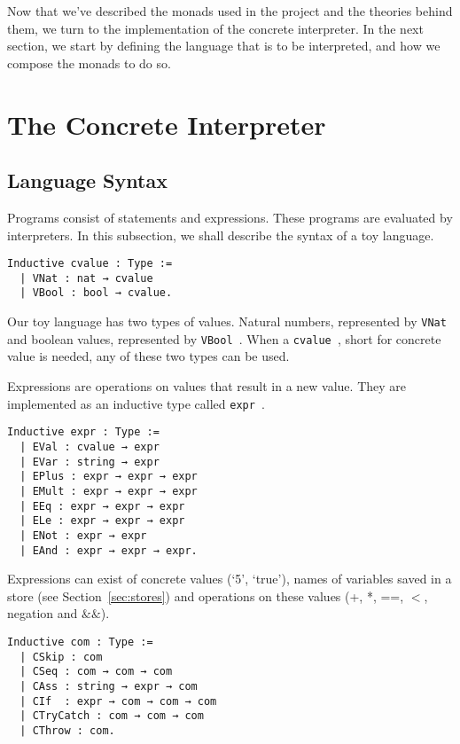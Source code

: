 Now that we've described the monads used in the project and the 
theories behind them, we turn to the implementation of the concrete
interpreter. In the next section, we start by defining the language that is to
be interpreted, and how we compose the monads to do so.

\section{The Concrete Interpreter}\label{sec:concrete}

\subsection{Language Syntax}
\label{sec:lang}
Programs consist of statements and expressions. These programs are evaluated by
interpreters. In this subsection, we shall describe the syntax of a toy
language.

\begin{listing}
\begin{verbatim}
Inductive cvalue : Type :=
  | VNat : nat → cvalue
  | VBool : bool → cvalue.
\end{verbatim}
\end{listing}

Our toy language has two types of values. Natural numbers, represented by
\texttt{VNat } and boolean values, represented by \texttt{VBool }. 
When a \texttt{cvalue }, short for concrete value is needed, any of
these two types can be used.

Expressions are operations on values that result in a new value. They are
implemented as an inductive type called \texttt{expr }. 

\begin{listing}
\begin{verbatim}
Inductive expr : Type :=
  | EVal : cvalue → expr
  | EVar : string → expr
  | EPlus : expr → expr → expr
  | EMult : expr → expr → expr
  | EEq : expr → expr → expr
  | ELe : expr → expr → expr
  | ENot : expr → expr
  | EAnd : expr → expr → expr.
\end{verbatim}
\end{listing}

Expressions can exist of concrete values (`5', `true'), names of variables
saved in a store (see Section~\ref{sec:stores}) and operations on these values
(+, *, ==, $<$, negation and $\&\&$). 

\begin{listing}
\begin{verbatim}
Inductive com : Type :=
  | CSkip : com
  | CSeq : com → com → com
  | CAss : string → expr → com
  | CIf  : expr → com → com → com
  | CTryCatch : com → com → com
  | CThrow : com. 
\end{verbatim}
\end{listing}


